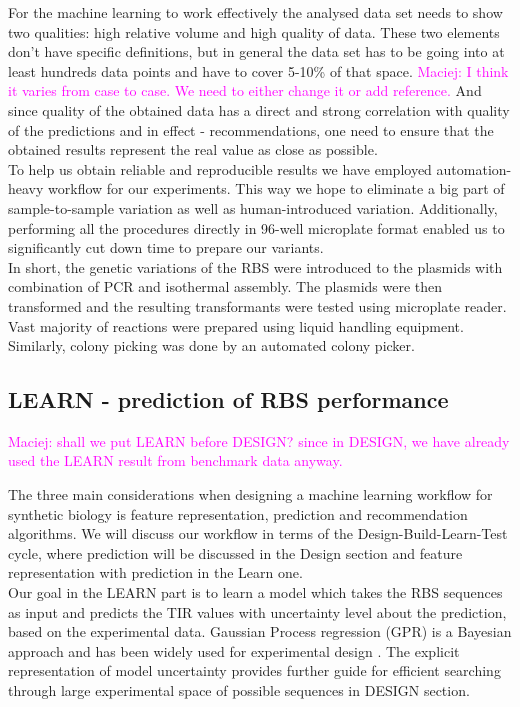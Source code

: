 \documentclass{article}
\newcommand{\mengyan}[1]{\textcolor{magenta}{#1}}
\begin{document}
For the machine learning to work effectively the analysed data set needs to show two qualities: high relative volume and high quality of data.
These two elements don't have specific definitions, but in general the data set has to be going into at least hundreds data points and have to cover 5-10\% of that space.
\mengyan{Maciej: I think it varies from case to case. We need to either change it or add reference.}
And since quality of the obtained data has a direct and strong correlation with quality of the predictions and in effect - recommendations, one need to ensure that the obtained results represent the real value as close as possible.\\
To help us obtain reliable and reproducible results we have employed automation-heavy workflow for our experiments.
This way we hope to eliminate a big part of sample-to-sample variation as well as human-introduced variation.
Additionally, performing all the procedures directly in 96-well microplate format enabled us to significantly cut down time to prepare our variants.\\
In short, the genetic variations of the RBS were introduced to the plasmids with combination of PCR and isothermal assembly. 
The plasmids were then transformed and the resulting transformants were tested using microplate reader.
Vast majority of reactions were prepared using liquid handling equipment.
Similarly, colony picking was done by an automated colony picker.\\

\subsection{LEARN - prediction of RBS performance}
\mengyan{Maciej: shall we put LEARN before DESIGN? since in DESIGN, we have already used the LEARN result from benchmark data anyway.}

The three main considerations when designing a machine learning workflow for synthetic biology is feature representation, prediction and recommendation algorithms.
We will discuss our workflow in terms of the Design-Build-Learn-Test cycle, where prediction will be discussed in the Design section and feature representation with prediction in the Learn one.\\


Our goal in the LEARN part is to learn a model which takes the RBS sequences as input and predicts the TIR values with uncertainty level about the prediction, based on the experimental data.
Gaussian Process regression (GPR) is a Bayesian approach and has been widely used for experimental design \cite{srinivas2012information, romero_navigating_2013}.
The explicit representation of model uncertainty provides further guide for efficient searching through large experimental space of possible sequences in DESIGN section. 
\end{document}
